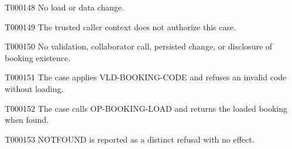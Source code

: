\documentclass[11pt,a4paper]{article}
\begin{document}
\begin{atlasparagraph}{T000148}
No load or data change.
\end{atlasparagraph}
\begin{atlasparagraph}{T000149}
The trusted caller context does not authorize this case.
\end{atlasparagraph}
\begin{atlasparagraph}{T000150}
No validation, collaborator call, persisted change, or disclosure of booking existence.
\end{atlasparagraph}
\begin{atlasparagraph}{T000151}
The case applies VLD-BOOKING-CODE and refuses an invalid code without loading.
\end{atlasparagraph}
\begin{atlasparagraph}{T000152}
The case calls OP-BOOKING-LOAD and returns the loaded booking when found.
\end{atlasparagraph}
\begin{atlasparagraph}{T000153}
NOT\AtlasCharUnderscore{}FOUND is reported as a distinct refusal with no effect.
\end{atlasparagraph}
\end{document}
